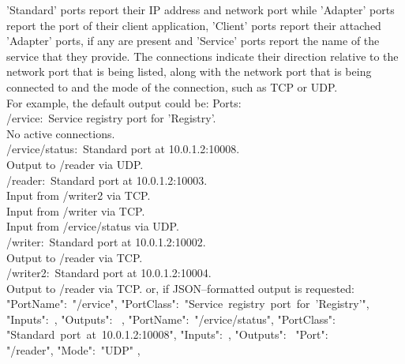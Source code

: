 'Standard' ports report their IP address and network port while 'Adapter' ports report
the \mplusm{} port of their client application, 'Client' ports report their attached
'Adapter' ports, if any are present and 'Service' ports report the name of the \mplusm{}
service that they provide.
The connections indicate their direction relative to the \yarp{} network port that is
being listed, along with the \yarp{} network port that is being connected to and the mode
of the connection, such as TCP or UDP.\\

For example, the default output could be:
\outputBegin{}
Ports:\\
\settowidth{\utilLen}{Por}%
/\textdollar{}ervice:\ Service registry port for 'Registry'.\\
\hspace*{\utilLen}No active connections.\\
/\textdollar{}ervice/status:\ Standard port at 10.0.1.2:10008.\\
\hspace*{\utilLen}Output to /reader via UDP.\\
/reader:\ Standard port at 10.0.1.2:10003.\\
\hspace*{\utilLen}Input from /writer2 via TCP.\\
\hspace*{\utilLen}Input from /writer via TCP.\\
\hspace*{\utilLen}Input from /\textdollar{}ervice/status via UDP.\\
/writer:\ Standard port at 10.0.1.2:10002.\\
\hspace*{\utilLen}Output to /reader via TCP.\\
/writer2:\ Standard port at 10.0.1.2:10004.\\
\hspace*{\utilLen}Output to /reader via TCP.
\outputEnd{}
or, if JSON--formatted output is requested:
\outputBegin{}
\openSq{} \textbraceleft{} "PortName":\ "/\textdollar{}ervice",
"PortClass":\ "Service~registry~port~for~'Registry'", "Inputs":\ \sqPair, "Outputs":\
\sqPair{} \textbraceright{}, \textbraceleft{} "PortName":\ "/\textdollar{}ervice/status",
"PortClass":\ \\
"Standard~port~at~10.0.1.2:10008", "Inputs":\ \sqPair, "Outputs":\ \openSq{}
\textbraceleft{} "Port":\ \\
"/reader", "Mode":\ "UDP" \textbraceright{} \closeSq{} \textbraceright{},

